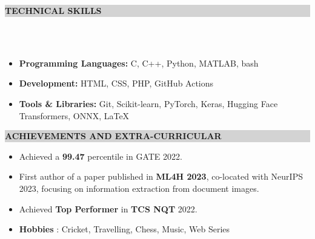 \documentclass[a4paper,10pt]{article}
\newcommand{\lsep}{-0.5cm}
\newcommand{\resheading}[1]{{\small \colorbox{lightgray}{\begin{minipage}{0.975\textwidth}{\textbf{#1 \vphantom{p\^{E}}}}\end{minipage}}}}
\begin{document}
\resheading{\textbf{ TECHNICAL SKILLS}} \\[\lsep] \\[-0.4cm]
\vspace{0.1cm}
\begin{itemize}
    \item \textbf{Programming Languages:} C, C++, Python, MATLAB, bash
    \vspace{-0.19cm}
    
    \item \textbf{Development:} HTML, CSS, PHP, GitHub Actions
    \vspace{-0.19cm}
    
    \item \textbf{Tools \& Libraries:} Git, Scikit-learn, PyTorch, Keras, Hugging Face Transformers, ONNX, \LaTeX
    \vspace{-0.10cm}
\end{itemize}
\vspace{0.15cm}
\resheading{\textbf{ACHIEVEMENTS AND EXTRA-CURRICULAR}}
\vspace{-0.1cm}

\begin{itemize}[noitemsep,nolistsep]
    \vspace{0.25cm}
    \item Achieved a \textbf{99.47} percentile in GATE 2022.
    \vspace{0.05cm}
    \item First author of a paper published in \textbf{ML4H 2023}, co-located with NeurIPS 2023, focusing on information extraction from document images.
    \vspace{0.05cm}
    \item Achieved \textbf{Top Performer} in \textbf{TCS NQT} 2022.
    \vspace{0.05cm}
    \item \textbf{Hobbies} : Cricket, Travelling, Chess, Music, Web Series
\end{itemize}
\end{document}
